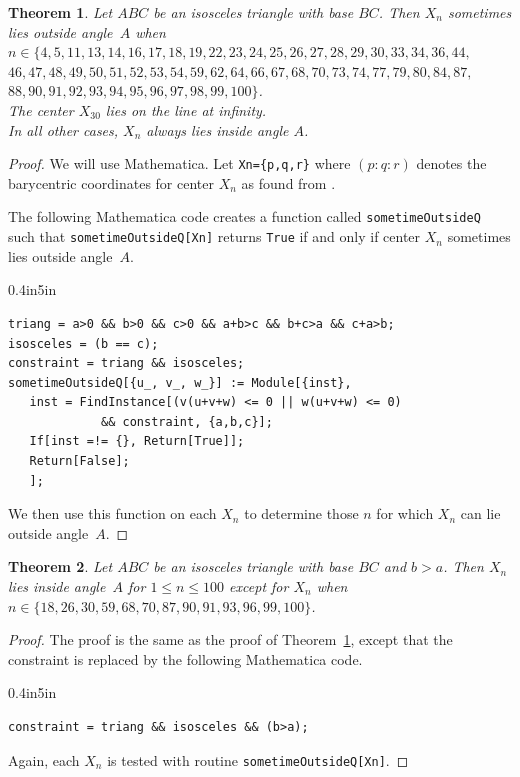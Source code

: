 \documentclass[12pt,a4paper]{amsart}
\newtheorem{theorem}{Theorem} [section]
\begin{document}
\begin{theorem}
\label{thm:insideIso}
Let $ABC$ be an isosceles triangle with base $BC$.
Then $X_n$ sometimes lies outside angle~$A$ when\\
$n\in \{4, 5, 11, 13, 14, 16, 17, 18, 19, 22, 23, 24, 25, 26, 27, 28, 29, 30,
33, 34, 36, 44,$\\
$46, 47, 48, 49, 50, 51, 52, 53, 54, 59, 62, 64, 66, 67,
68, 70, 73, 74, 77, 79, 80, 84, 87,$\\
$88, 90, 91, 92, 93, 94, 95, 96,
97, 98, 99, 100\}$.\\
The center $X_{30}$ lies on the line at infinity.\\
In all other cases, $X_n$ always lies inside angle $A$.
\end{theorem}

\begin{proof}
We will use Mathematica. Let \texttt{Xn=\{p,q,r\}} where $(p:q:r)$ denotes the barycentric
coordinates for center $X_n$ as found from \cite{ETC}.

The following Mathematica code creates a function called \texttt{sometimeOutsideQ}
such that \texttt{sometimeOutsideQ[Xn]} returns \texttt{True} if and only if
center $X_n$ sometimes lies outside angle~$A$.

\begin{code}{0.4in}{5in}
\begin{verbatim}
triang = a>0 && b>0 && c>0 && a+b>c && b+c>a && c+a>b;
isosceles = (b == c);
constraint = triang && isosceles;
sometimeOutsideQ[{u_, v_, w_}] := Module[{inst},
   inst = FindInstance[(v(u+v+w) <= 0 || w(u+v+w) <= 0)
             && constraint, {a,b,c}];
   If[inst =!= {}, Return[True]];
   Return[False];
   ];
\end{verbatim}
\end{code}

We then use this function on each $X_n$ to determine those $n$ for which
$X_n$ can lie outside angle~$A$.
\end{proof}

\begin{theorem}
\label{thm:inside}
Let $ABC$ be an isosceles triangle with base $BC$ and $b>a$.
Then $X_n$ lies inside angle~$A$ for $1\leq n\leq 100$ except for $X_n$
when\\
$n\in \{18,  26,  30, 59, 68, 70, 87, 90, 91, 93, 96, 99, 100\}$.
\end{theorem}

\begin{proof}
The proof is the same as the proof of Theorem~\ref{thm:insideIso}, except that the constraint
is replaced by the following Mathematica code.

\begin{code}{0.4in}{5in}
\begin{verbatim}
constraint = triang && isosceles && (b>a);
\end{verbatim}
\end{code}

Again, each $X_n$ is tested with routine \texttt{sometimeOutsideQ[Xn]}.
\end{proof}
\end{document}
